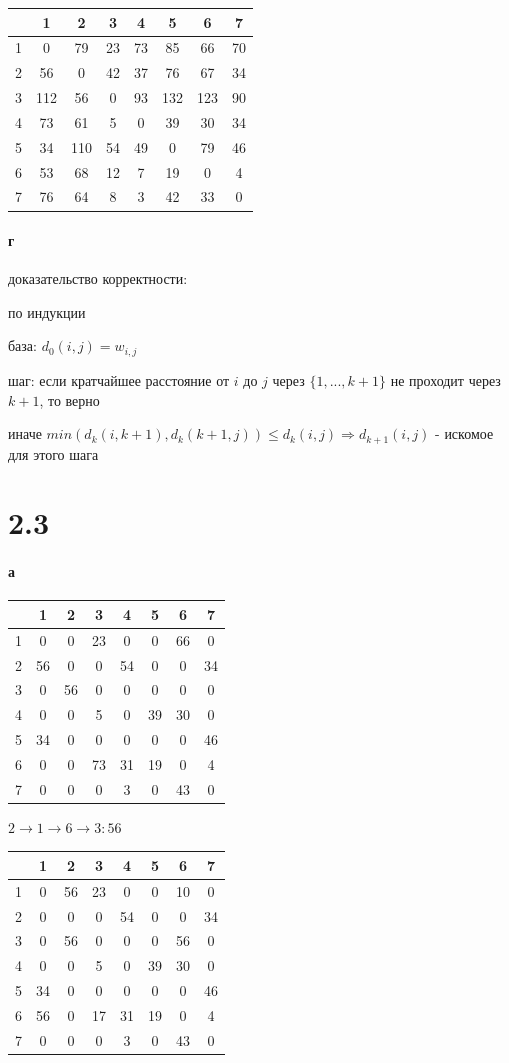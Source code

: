\documentclass[russian]{article}
\begin{document}
\begin{tabular}{|c|c|c|c|c|c|c|c|}\hline
& 1& 2& 3& 4& 5& 6& 7\\\hline
1&0&79&23&73&85&66&70\\\hline
2&56&0&42&37&76&67&34\\\hline
3&112&56&0&93&132&123&90\\\hline
4&73&61&5&0&39&30&34\\\hline
5&34&110&54&49&0&79&46\\\hline
6&53&68&12&7&19&0&4\\\hline
7&76&64&8&3&42&33&0\\\hline
\end{tabular}

\paragraph*{г} доказательство корректности:

по индукции

база: $d_0(i,j)=w_{i,j}$

шаг: если кратчайшее расстояние от $i$ до $j$ через $\{1, ..., k+1\}$ не проходит через $k+1$, то верно

иначе $min(d_k(i, k+1), d_k(k+1, j)) \le d_k(i, j) \Rightarrow d_{k+1}(i,j)$ - искомое для этого шага

\section*{2.3}

\paragraph*{а}

\begin{tabular}{|c|c|c|c|c|c|c|c|}\hline
& 1& 2& 3& 4& 5& 6& 7\\\hline
1&0&0&23&0&0&66&0\\\hline
2&56&0&0&54&0&0&34\\\hline
3&0&56&0&0&0&0&0\\\hline
4&0&0&5&0&39&30&0\\\hline
5&34&0&0&0&0&0&46\\\hline
6&0&0&73&31&19&0&4\\\hline
7&0&0&0&3&0&43&0\\\hline
\end{tabular}

$ 2 \to 1 \to 6 \to 3 : 56$

\begin{tabular}{|c|c|c|c|c|c|c|c|}\hline
& 1& 2& 3& 4& 5& 6& 7\\\hline
1&0&56&23&0&0&10&0\\\hline
2&0&0&0&54&0&0&34\\\hline
3&0&56&0&0&0&56&0\\\hline
4&0&0&5&0&39&30&0\\\hline
5&34&0&0&0&0&0&46\\\hline
6&56&0&17&31&19&0&4\\\hline
7&0&0&0&3&0&43&0\\\hline
\end{tabular}
\end{document}
